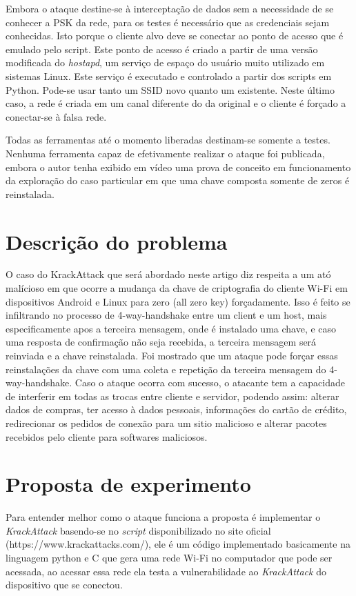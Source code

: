 \documentclass[12pt]{article}
\begin{document}
Embora o ataque destine-se à interceptação de dados sem a necessidade de se conhecer a PSK da rede, para os testes é necessário que as credenciais sejam conhecidas. Isto porque o cliente alvo deve se conectar ao ponto de acesso que é emulado pelo script. Este ponto de acesso é criado a partir de uma versão modificada do \textit{hostapd}, um serviço de espaço do usuário muito utilizado em sistemas Linux. Este serviço é executado e controlado a partir dos scripts em Python. Pode-se usar tanto um SSID novo quanto um existente. Neste último caso, a rede é criada em um canal diferente do da original e o cliente é forçado a conectar-se à falsa rede.

Todas as ferramentas até o momento liberadas destinam-se somente a testes. Nenhuma ferramenta capaz de efetivamente realizar o ataque foi publicada, embora o autor tenha exibido em vídeo uma prova de conceito em funcionamento da exploração do caso particular em que uma chave composta somente de zeros é reinstalada.

\section{Descrição do problema}
O caso do KrackAttack que será abordado neste artigo diz respeita a um ató malícioso em que ocorre a mudança da chave de criptografia do cliente Wi-Fi em dispositivos Android e Linux  para zero (all zero key) forçadamente. Isso é feito se infiltrando no processo de 4-way-handshake entre um client e um host, mais especificamente apos a terceira mensagem, onde é instalado uma chave, e caso uma resposta de confirmação não seja recebida, a terceira mensagem será reinviada e a chave reinstalada. Foi mostrado que um ataque pode forçar essas reinstalações da chave com uma coleta e repetição da terceira mensagem do 4-way-handshake. Caso o ataque ocorra com sucesso, o atacante tem a capacidade de interferir em todas as trocas entre cliente e servidor, podendo assim: alterar dados de compras, ter acesso à dados pessoais, informações do cartão de crédito, redirecionar os pedidos de conexão para um sitio malicioso e alterar pacotes recebidos pelo cliente para softwares maliciosos. 


\section{Proposta de experimento}
Para entender melhor como o ataque funciona a proposta é implementar o \textit{KrackAttack} basendo-se no \textit{script} disponibilizado no site oficial (https://www.krackattacks.com/), ele é um código implementado basicamente na linguagem python e C que gera uma rede Wi-Fi no computador que pode ser acessada, ao acessar essa rede ela testa a vulnerabilidade ao \textit{KrackAttack} do dispositivo que se conectou.
\end{document}
